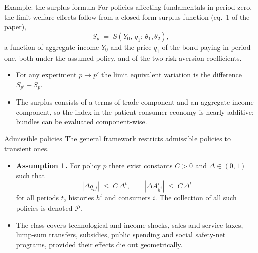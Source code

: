 \documentclass[aspectratio=169,11pt]{beamer}
\begin{document}
\begin{frame}{Example: the surplus formula}
  \small For policies affecting fundamentals in period zero, the limit
  welfare effects follow from a closed-form surplus function (eq.\ 1 of the
  paper),
  \[ S_p \;=\; S\!\left(Y_0,\,q_1;\,\theta_1,\theta_2\right), \]
  a function of aggregate income $Y_0$ and the price $q_1$ of the bond
  paying in period one, both under the assumed policy, and of the two
  risk-aversion coefficients.
  \begin{itemize}
    \item For any experiment $p \to p'$ the limit equivalent variation is
          the difference $S_{p'}-S_p$.
    \item The surplus consists of a terms-of-trade component and an
          aggregate-income component, so the index in the patient-consumer
          economy is nearly additive: bundles can be evaluated
          component-wise.
  \end{itemize}
\end{frame}

\begin{frame}{Admissible policies}
  \small The general framework restricts admissible policies to transient
  ones.
  \begin{itemize}
    \item \textbf{Assumption 1.} For policy $p$ there exist constants $C>0$
          and $\Delta\in(0,1)$ such that
          \[ \left|\Delta q_{h^{t}}\right| \;\le\; C\,\Delta^{t},
             \qquad
             \left|\Delta A^{i}_{h^{t}}\right| \;\le\; C\,\Delta^{t} \]
          for all periods $t$, histories $h^{t}$ and consumers $i$. The
          collection of all such policies is denoted $\mathcal{P}$.
    \item The class covers technological and income shocks, sales and
          service taxes, lump-sum transfers, subsidies, public spending and
          social safety-net programs, provided their effects die out
          geometrically.
  \end{itemize}
\end{frame}
\end{document}
